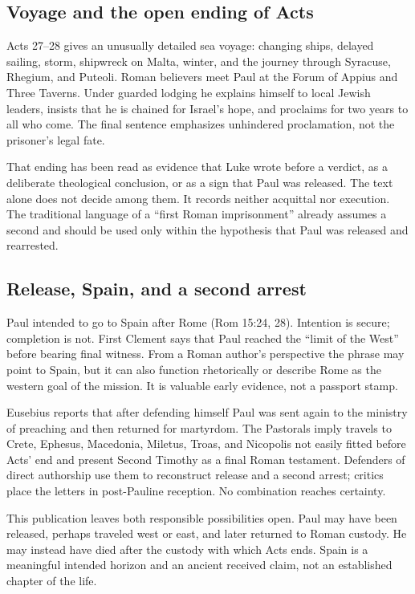 \subsection{Voyage and the open ending of Acts}

Acts 27--28 gives an unusually detailed sea voyage: changing ships, delayed
sailing, storm, shipwreck on Malta, winter, and the journey through Syracuse,
Rhegium, and Puteoli. Roman believers meet Paul at the Forum of Appius and
Three Taverns. Under guarded lodging he explains himself to local Jewish
leaders, insists that he is chained for Israel's hope, and proclaims for two
years to all who come. The final sentence emphasizes unhindered proclamation,
not the prisoner's legal fate.

That ending has been read as evidence that Luke wrote before a verdict, as a
deliberate theological conclusion, or as a sign that Paul was released. The
text alone does not decide among them. It records neither acquittal nor
execution. The traditional language of a ``first Roman imprisonment'' already
assumes a second and should be used only within the hypothesis that Paul was
released and rearrested.

\subsection{Release, Spain, and a second arrest}

Paul intended to go to Spain after Rome (Rom 15:24, 28). Intention is secure;
completion is not. First Clement says that Paul reached the ``limit of the
West'' before bearing final witness. From a Roman author's perspective the
phrase may point to Spain, but it can also function rhetorically or describe
Rome as the western goal of the mission. It is valuable early evidence, not a
passport stamp.

Eusebius reports that after defending himself Paul was sent again to the
ministry of preaching and then returned for martyrdom. The Pastorals imply
travels to Crete, Ephesus,
Macedonia, Miletus, Troas, and Nicopolis not easily fitted before Acts' end and
present Second Timothy as a final Roman testament. Defenders of direct
authorship use them to reconstruct release and a second arrest; critics place
the letters in post-Pauline reception. No combination reaches certainty.

This publication leaves both responsible possibilities open. Paul may have
been released, perhaps traveled west or east, and later returned to Roman
custody. He may instead have died after the custody with which Acts ends. Spain
is a meaningful intended horizon and an ancient received claim, not an
established chapter of the life.

